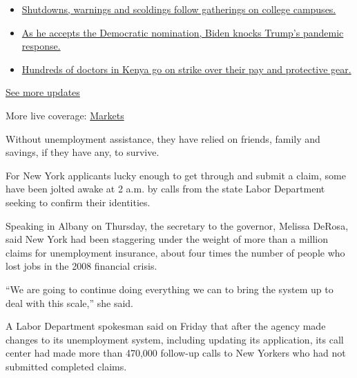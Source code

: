 \begin{itemize}
\tightlist
\item
  \href{https://www.nytimes3xbfgragh.onion/2020/08/21/world/covid-19-coronavirus.html?action=click\&pgtype=Article\&state=default\&region=MAIN_CONTENT_1\&context=storylines_live_updates\#link-4690b6aa}{Shutdowns,
  warnings and scoldings follow gatherings on college campuses.}
\item
  \href{https://www.nytimes3xbfgragh.onion/2020/08/21/world/covid-19-coronavirus.html?action=click\&pgtype=Article\&state=default\&region=MAIN_CONTENT_1\&context=storylines_live_updates\#link-324af071}{As
  he accepts the Democratic nomination, Biden knocks Trump's pandemic
  response.}
\item
  \href{https://www.nytimes3xbfgragh.onion/2020/08/21/world/covid-19-coronavirus.html?action=click\&pgtype=Article\&state=default\&region=MAIN_CONTENT_1\&context=storylines_live_updates\#link-35890b73}{Hundreds
  of doctors in Kenya go on strike over their pay and protective gear.}
\end{itemize}

\href{https://www.nytimes3xbfgragh.onion/2020/08/21/world/covid-19-coronavirus.html?action=click\&pgtype=Article\&state=default\&region=MAIN_CONTENT_1\&context=storylines_live_updates}{See
more updates}

More live coverage:
\href{https://www.nytimes3xbfgragh.onion/live/2020/08/20/business/stock-market-today-coronavirus?action=click\&pgtype=Article\&state=default\&region=MAIN_CONTENT_1\&context=storylines_live_updates}{Markets}

Without unemployment assistance, they have relied on friends, family and
savings, if they have any, to survive.

For New York applicants lucky enough to get through and submit a claim,
some have been jolted awake at 2 a.m. by calls from the state Labor
Department seeking to confirm their identities.

Speaking in Albany on Thursday, the secretary to the governor, Melissa
DeRosa, said New York had been staggering under the weight of more than
a million claims for unemployment insurance, about four times the number
of people who lost jobs in the 2008 financial crisis.

``We are going to continue doing everything we can to bring the system
up to deal with this scale,'' she said.

A Labor Department spokesman said on Friday that after the agency made
changes to its unemployment system, including updating its application,
its call center had made more than 470,000 follow-up calls to New
Yorkers who had not submitted completed claims.

